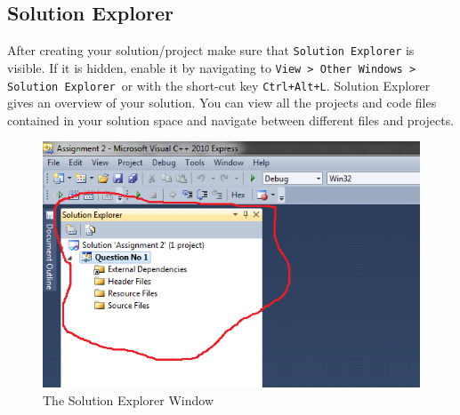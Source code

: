 \documentclass{article}
\begin{document}
\subsection{Solution Explorer}
After creating your solution/project make sure that \verb|Solution Explorer| is visible. If it is hidden, enable it by navigating to \verb|View > Other Windows > Solution Explorer|\footnotemark~or with the short-cut key \verb|Ctrl+Alt+L|. Solution Explorer gives an overview of your solution. You can view all the projects and code files contained in your solution space and navigate between different files and projects.

\begin{figure}[H]
\centering
\includegraphics[scale=0.5]{Solution_Explorer.png}
\caption{The Solution Explorer Window}
\end{figure}
\end{document}
